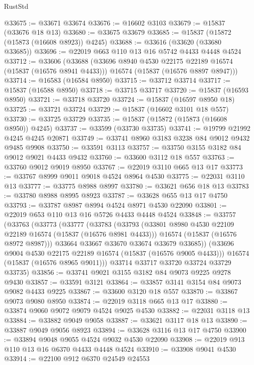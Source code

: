 \begin{lexlean}{RustStd}
\begin{coremodule}
@33675 := @33671 @33674
@33676 := @16602 @3103
@33679 := @15837 (@33676 @18 @13)
@33680 := @33675 @33679
@33685 := @15837 (@15872 (@15873 (@16608 @8923)) @4245)
@33688 := @33616 (@33620 (@33680 @33685))
@33696 := @22019 @663 @110 @13 @16 @5742 @4433 @4448 @4524
@33712 := @33606
    (@33688
      (@33696 @8940 @4530 @22175 @22189 @16574 (@15837 (@16576 @8941 @4433)))
      @16574
      (@15837 (@16576 @8897 @8947)))
@33714 := @16583 (@16584 @8950)
@33715 := @33712 @33714
@33717 := @15837 (@16588 @8950)
@33718 := @33715 @33717
@33720 := @15837 (@16593 @8950)
@33721 := @33718 @33720
@33724 := @15837 (@16597 @8950 @18)
@33725 := @33721 @33724
@33729 := @15837 (@16602 @3101 @18 @557)
@33730 := @33725 @33729
@33735 := @15837 (@15872 (@15873 (@16608 @8950)) @4245)
@33737 := @33599 (@33730 @33735)
@33741 := @19799 @21992 @4245 @4245 @20871
@33749 := @33741 @8960 @3183 @3238 @84 @9012 @9432 @9485 @9908
@33750 := @33591 @3113
@33757 := @33750 @3155 @3182 @84 @9012 @9021 @4433 @9432
@33760 := @33600 @3112 @18 @557
@33763 := @33760 @9012 @9019 @8950
@33767 := @22019 @3110 @665 @13 @17
@33773 := @33767 @8999 @9011 @9018 @4524 @8964 @4530
@33775 := @22031 @3110 @13
@33777 := @33775 @8988 @8997
@33780 := @33621 @656 @18 @13
@33783 := @33780 @8988 @8995 @8923
@33787 := @33628 @655 @13 @17 @4750
@33793 := @33787 @8987 @8994 @4524 @8971 @4530 @22090
@33801 := @22019 @653 @110 @13 @16 @5726 @4433 @4448 @4524
@33848 := @33757
    (@33763
      (@33773
        (@33777
          (@33783
            (@33793
              (@33801 @8980 @4530 @22109 @22189 @16574 (@15837 (@16576 @8981 @4433)))
              @16574
              (@15837 (@16576 @8972 @8987)))
            @33664
            @33667
            @33670
            @33674
            @33679
            @33685))
        (@33696 @9004 @4530 @22175 @22189 @16574 (@15837 (@16576 @9005 @4433)))
        @16574
        (@15837 (@16576 @8965 @9011)))
      @33714
      @33717
      @33720
      @33724
      @33729
      @33735)
@33856 := @33741 @9021 @3155 @3182 @84 @9073 @9225 @9278 @9430
@33857 := @33591 @3121
@33864 := @33857 @3141 @3154 @84 @9073 @9082 @4433 @9225
@33867 := @33600 @3120 @18 @557
@33870 := @33867 @9073 @9080 @8950
@33874 := @22019 @3118 @665 @13 @17
@33880 := @33874 @9060 @9072 @9079 @4524 @9025 @4530
@33882 := @22031 @3118 @13
@33884 := @33882 @9049 @9058
@33887 := @33621 @3117 @18 @13
@33890 := @33887 @9049 @9056 @8923
@33894 := @33628 @3116 @13 @17 @4750
@33900 := @33894 @9048 @9055 @4524 @9032 @4530 @22090
@33908 := @22019 @913 @110 @13 @16 @6370 @4433 @4448 @4524
@33910 := @33908 @9041 @4530
@33914 := @22100 @912 @6370 @24549 @24553

\end{coremodule}
\end{lexlean}
